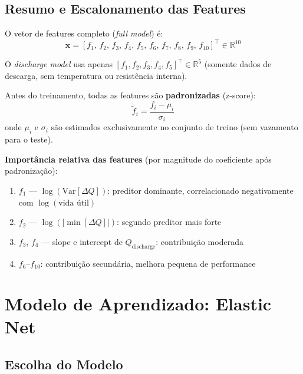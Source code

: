 \documentclass[12pt,a4paper]{article}
\begin{document}
\subsection{Resumo e Escalonamento das Features}

O vetor de features completo (\textit{full model}) \'{e}:
\[
  \mathbf{x} = [f_1,\, f_2,\, f_3,\, f_4,\, f_5,\, f_6,\, f_7,\, f_8,\, f_9,\, f_{10}]^\top
  \in \mathbb{R}^{10}
\]

O \textit{discharge model} usa apenas $[f_1, f_2, f_3, f_4, f_5]^\top \in \mathbb{R}^5$
(somente dados de descarga, sem temperatura ou resist\^{e}ncia interna).

Antes do treinamento, todas as features s\~ao \textbf{padronizadas}
(z-score):
\begin{equation}
  \tilde{f}_i = \frac{f_i - \mu_i}{\sigma_i}
\end{equation}
onde $\mu_i$ e $\sigma_i$ s\~ao estimados exclusivamente no conjunto de
treino (sem vazamento para o teste).

\textbf{Import\^{a}ncia relativa das features} (por magnitude do coeficiente
ap\'{o}s padroniza\c{c}\~ao):

\begin{enumerate}
  \item $f_1$ --- $\log(\text{Var}[\Delta Q])$: preditor dominante, correlacionado
    negativamente com $\log(\text{vida \'{u}til})$
  \item $f_2$ --- $\log(|\min[\Delta Q]|)$: segundo preditor mais forte
  \item $f_3$, $f_4$ --- slope e intercept de $Q_{\text{discharge}}$:
    contribui\c{c}\~ao moderada
  \item $f_6$--$f_{10}$: contribui\c{c}\~ao secund\'{a}ria, melhora pequena de
    performance
\end{enumerate}

\section{Modelo de Aprendizado: Elastic Net}

\subsection{Escolha do Modelo}
\end{document}
